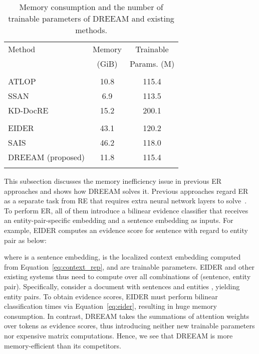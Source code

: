 \documentclass[11pt]{article}
\begin{document}
\label{sec:memory}

\begin{table}[t]
    \centering
    \small
    \begin{tabular}{lcc}
    \Xhline{3\arrayrulewidth}
    Method &  Memory & Trainable \\
    & (GiB) & Params. (M) \\
     \Xhline{3\arrayrulewidth}
    \multicolumn{3}{l}{\textbf{(a) without ER Module}} \\
    ATLOP~\cite{zhou2021atlop} & 10.8 & 115.4\\
    SSAN~\cite{xu-etal-2021-ssan} & 6.9 & 113.5\\
    KD-DocRE~\cite{tan-etal-2022-document} & 15.2 & 200.1 \\
    \Xhline{2\arrayrulewidth}
    \multicolumn{2}{l}{\textbf{(b) with ER Module}} \\
    EIDER~\cite{xie-etal-2022-eider} & 43.1 & 120.2 \\
    SAIS~\cite{xiao-etal-2022-sais} & 46.2 & 118.0 \\
    DREEAM (proposed) & 11.8 & 115.4 \\
    \Xhline{3\arrayrulewidth}
    \end{tabular}
    \caption{Memory consumption and the number of trainable parameters of DREEAM and existing methods.}
    \label{tab:memory}
\end{table}

This subsection discusses the memory inefficiency issue in previous ER approaches and shows how DREEAM solves it.
Previous approaches regard ER as a separate task from RE that requires extra neural network layers to solve~\cite{huang-etal-2021-entity,xie-etal-2022-eider,xiao-etal-2022-sais}.
To perform ER, all of them introduce a bilinear evidence classifier that receives an entity-pair-specific embedding and a sentence embedding as inputs.
For example, EIDER computes an evidence score for sentence  with regard to entity pair  as below:

where  is a sentence embedding,  is the localized context embedding computed from Equation~\ref{eq:context_rep},  and  are trainable parameters.
EIDER and other existing systems thus need to compute over all combinations of (sentence, entity pair).
Specifically, consider a document  with  sentences  and  entities , yielding  entity pairs.
To obtain evidence scores, EIDER must perform bilinear classification  times via Equation~\ref{eq:eider}, resulting in huge memory consumption.
In contrast, DREEAM takes the summations of attention weights over tokens as evidence scores, thus introducing neither new trainable parameters nor expensive matrix computations.
Hence, we see that DREEAM is more memory-efficient than its competitors.
\end{document}
